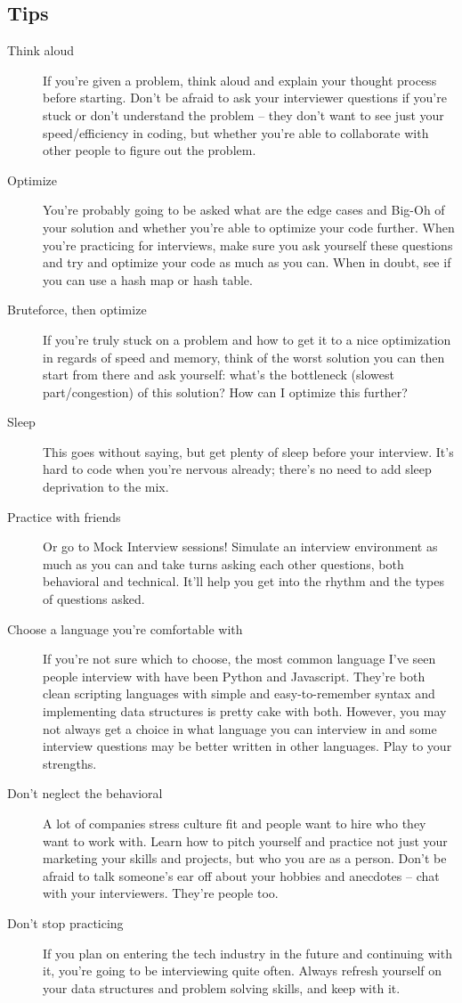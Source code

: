 \documentclass{article}
\begin{document}
\subsection {Tips}
\begin{description}
\item[Think aloud] If you're given a problem, think aloud and explain your
  thought process before starting. Don't be afraid to ask your interviewer
  questions if you're stuck or don't understand the problem -- they don't want
  to see just your speed/efficiency in coding, but whether you're able to
  collaborate with other people to figure out the problem.
\item[Optimize] You're probably going to be asked what are the edge cases and
  Big-Oh of your solution and whether you're able to optimize your code
  further. When you're practicing for interviews, make sure you ask yourself
  these questions and try and optimize your code as much as you can. When in
  doubt, see if you can use a hash map or hash table.
\item[Bruteforce, then optimize] If you're truly stuck on a problem and how to
  get it to a nice optimization in regards of speed and memory, think of the
  worst solution you can then start from there and ask yourself: what's the
  bottleneck (slowest part/congestion) of this solution? How can I
  optimize this further?
\item[Sleep] This goes without saying, but get plenty of sleep before your
  interview. It's hard to code when you're nervous already; there's no need to
  add sleep deprivation to the mix.
\item[Practice with friends] Or go to Mock Interview sessions! Simulate an
  interview environment as much as you can and take turns asking each other
  questions, both behavioral and technical. It'll help you get into the rhythm
  and the types of questions asked.
\item[Choose a language you're comfortable with] If you're not sure which to
  choose, the most common language I've seen people interview with have been
  Python and Javascript. They're both clean scripting languages with simple and
  easy-to-remember syntax and implementing data structures is pretty cake with
  both. However, you may not always get a choice in what language you can
  interview in and some interview questions may be better written in
  other languages. Play to your strengths.
\item[Don't neglect the behavioral] A lot of companies stress culture fit and
  people want to hire who they want to work with. Learn how to pitch yourself
  and practice not just your marketing your skills and projects, but who you are
  as a person. Don't be afraid to talk someone's ear off about your hobbies and
  anecdotes -- chat with your interviewers. They're
  people too.
\item[Don't stop practicing] If you plan on entering the tech industry in the
  future and continuing with it, you're going to be interviewing quite
  often. Always refresh yourself on your data structures and problem solving
  skills, and keep with it.
\end{description}
\end{document}
